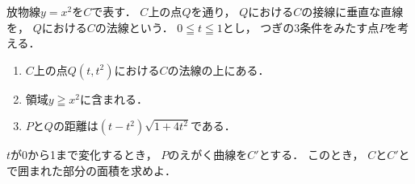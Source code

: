 \documentclass[../../main.tex]{subfiles}
\begin{document}
放物線$y=x^2$を$C$で表す．
$C$上の点$Q$を通り，
$Q$における$C$の接線に垂直な直線を，
$Q$における$C$の法線という．
$0\leqq t \leqq1$とし，
つぎの3条件をみたす点$P$を考える．
\begin{enumerate}
  \item $C$上の点$Q(t,t^2)$における$C$の法線の上にある．
  \item 領域$y \geqq x^2$に含まれる．
  \item $P$と$Q$の距離は$(t-t^2)\sqrt{1+4t^2}$である．
\end{enumerate}
$t$が0から1まで変化するとき，
$P$のえがく曲線を$C'$とする．
このとき，
$C$と$C'$とで囲まれた部分の面積を求めよ．
\end{document}
